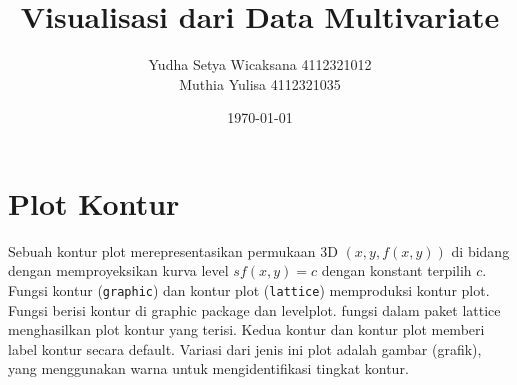 \documentclass[a4paper,12pt]{article}
\theoremstyle{definition}
\begin{document}
    \title{Visualisasi dari Data Multivariate}
    \author{Yudha Setya Wicaksana 4112321012\\
    Muthia Yulisa 4112321035}
\date{\today}
\begin{titlepage}
    \maketitle
\end{titlepage}

\section{Plot Kontur}
Sebuah kontur plot merepresentasikan permukaan 3D $(x, y, f(x, y))$ di bidang dengan memproyeksikan kurva level $s f(x, y) = c$ dengan konstant terpilih $c$. Fungsi kontur (\texttt{graphic}) dan kontur plot (\texttt{lattice}) memproduksi kontur plot. Fungsi berisi kontur di graphic package dan levelplot. fungsi dalam paket lattice menghasilkan plot kontur yang terisi. Kedua kontur dan kontur plot memberi label kontur secara default. Variasi dari jenis ini plot adalah gambar (grafik), yang menggunakan warna untuk mengidentifikasi tingkat kontur.
\end{document}
